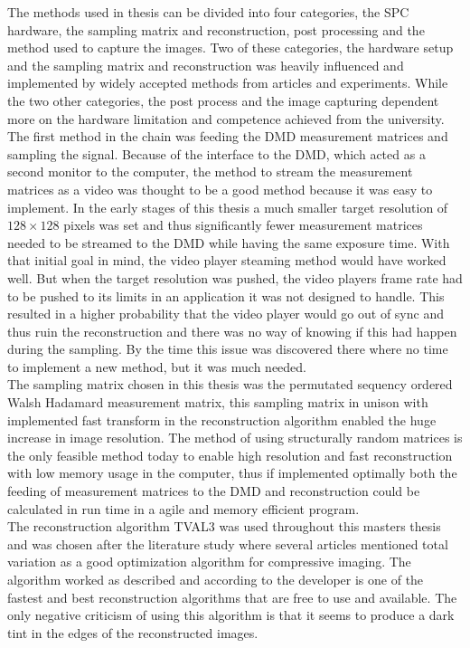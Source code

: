 The methods used in thesis can be divided into four categories, the SPC hardware, the sampling matrix and reconstruction, post processing and the method used to capture the images. Two of these categories, the hardware setup and the sampling matrix and reconstruction was heavily influenced and implemented by widely accepted methods from articles and experiments. While the two other categories, the post process and the image capturing dependent more on the hardware limitation and competence achieved from the university.\\[0.1in]

The first method in the chain was feeding the DMD measurement matrices and sampling the signal. Because of the interface to the DMD, which acted as a second monitor to the computer, the method to stream the measurement matrices as a video was thought to be a good method because it was easy to implement. In the early stages of this thesis a much smaller target resolution of $128 \times 128$ pixels was set and thus significantly fewer measurement matrices needed to be streamed to the DMD while having the same exposure time. With that initial goal in mind, the video player steaming method would have worked well. But when the target resolution was pushed, the video players frame rate had to be pushed to its limits in an application it was not designed to handle. This resulted in a higher probability that the video player would go out of sync and thus ruin the reconstruction and there was no way of knowing if this had happen during the sampling. By the time this issue was discovered there where no time to implement a new method, but it was much needed.\\[0.1in]

The sampling matrix chosen in this thesis was the permutated sequency ordered Walsh Hadamard measurement matrix, this sampling matrix in unison with implemented fast transform in the reconstruction algorithm enabled the huge increase in image resolution. The method of using structurally random matrices is the only feasible method today to enable high resolution and fast reconstruction with low memory usage in the computer, thus if implemented optimally both the feeding of measurement matrices to the DMD and reconstruction could be calculated in run time in a agile and memory efficient program.\\[0.1in]

The reconstruction algorithm TVAL3 was used throughout this masters thesis and was chosen after the literature study where several articles mentioned total variation as a good optimization algorithm for compressive imaging. The algorithm worked as described and according to the developer is one of the fastest and best reconstruction algorithms that are free to use and available. The only negative criticism of using this algorithm is that it seems to produce a dark tint in the edges of the reconstructed images.\\[0.1in]

